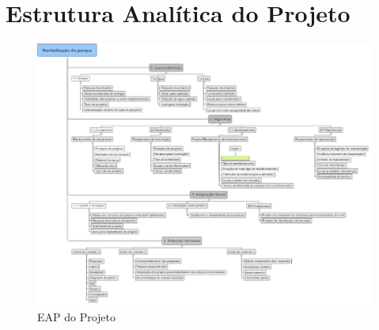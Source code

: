\section{Estrutura Anal\'itica do Projeto}

\begin{figure}[h]
	\centering
	\label{EAP}
		\includegraphics[keepaspectratio=true,scale=0.9,angle=270]{figuras/EAP-GERAL.png}
	\caption{EAP do Projeto}
\end{figure}


	